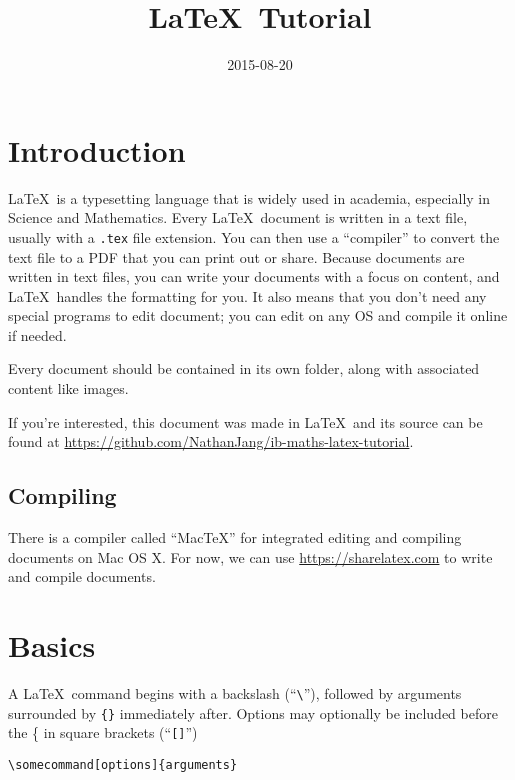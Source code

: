 \documentclass{chan}
\title{\LaTeX\ Tutorial}
\date{2015-08-20}
\subtitle{}
\begin{document}


\section{Introduction}

\LaTeX\ is a typesetting language that is widely used in academia, especially in Science and Mathematics.
Every \LaTeX\ document is written in a text file, usually with a \verb$.tex$ file extension.
You can then use a ``compiler'' to convert the text file to a PDF that you can print out or share.
Because documents are written in text files, you can write your documents with a focus on content, and \LaTeX\ handles the formatting for you.
It also means that you don't need any special programs to edit document; you can edit on any OS and compile it online if needed.

Every document should be contained in its own folder, along with associated content like images.

If you're interested, this document was made in \LaTeX\ and its source can be found at \url{https://github.com/NathanJang/ib-maths-latex-tutorial}.

\subsection{Compiling}

There is a compiler called ``MacTeX'' for integrated editing and compiling documents on Mac OS X.
For now, we can use \url{https://sharelatex.com} to write and compile documents.

\section{Basics}

A \LaTeX\ command begins with a backslash (``\verb$\$''), followed by arguments surrounded by \verb${}$ immediately after.
Options may optionally be included before the \{ in square brackets (``\verb$[]$'')

\begin{lstlisting}
\somecommand[options]{arguments}
\end{lstlisting}
\end{document}
